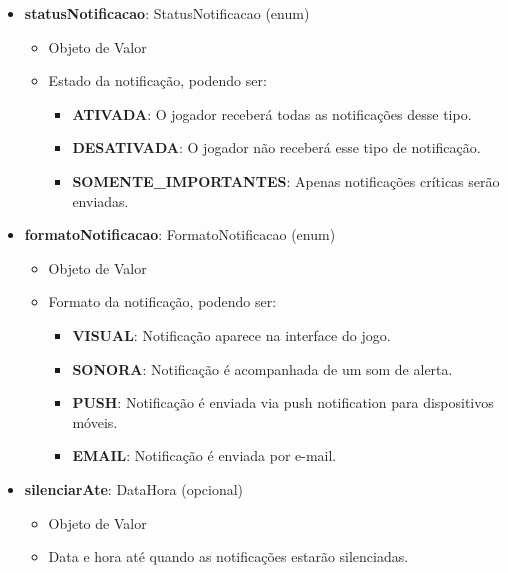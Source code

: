 \begin{itemize}
        \item \textbf{statusNotificacao}: StatusNotificacao (enum)  
              \begin{itemize}
                  \item Objeto de Valor
                  \item Estado da notificação, podendo ser:
                  \begin{itemize}
                      \item \textbf{ATIVADA}: O jogador receberá todas as notificações desse tipo.
                      \item \textbf{DESATIVADA}: O jogador não receberá esse tipo de notificação.
                      \item \textbf{SOMENTE\_IMPORTANTES}: Apenas notificações críticas serão enviadas.
                  \end{itemize}
              \end{itemize}
    
        \item \textbf{formatoNotificacao}: FormatoNotificacao (enum)  
              \begin{itemize}
                  \item Objeto de Valor
                  \item Formato da notificação, podendo ser:
                  \begin{itemize}
                      \item \textbf{VISUAL}: Notificação aparece na interface do jogo.
                      \item \textbf{SONORA}: Notificação é acompanhada de um som de alerta.
                      \item \textbf{PUSH}: Notificação é enviada via push notification para dispositivos móveis.
                      \item \textbf{EMAIL}: Notificação é enviada por e-mail.
                  \end{itemize}
              \end{itemize}
    
        \item \textbf{silenciarAte}: DataHora (opcional)  
              \begin{itemize}
                  \item Objeto de Valor
                  \item Data e hora até quando as notificações estarão silenciadas.
              \end{itemize}
    \end{itemize}
    
